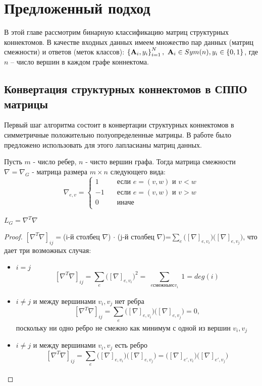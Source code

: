 \chapter{Предложенный подход}

В этой главе рассмотрим бинарную классификацию матриц структурных коннектомов. В качестве входных данных имеем множество пар данных (матриц смежности) и ответов (меток классов): $ \left\{ {\bf A}_i, y_i \right\}_{i=1}^N, \ {\bf A}_i \in Sym(n), y_i \in \left\{ 0,1 \right\}$, где $n$ – число вершин в каждом графе коннектома.

\section{Конвертация структурных коннектомов в СППО матрицы}
Первый шаг алгоритма состоит в конвертации структурных коннектомов в симметричные положительно полуопределенные матрицы. В работе \cite{dodero2015kernel} было предложено использовать для этого лапласианы матриц данных.

\begin{definition}
Пусть $m$ - число ребер, $n$ - чисто вершин графа. Тогда матрица смежности $\nabla = \nabla_G$ - матрица размера $m \times n$ следующего вида:
\begin{equation*} 
\nabla_{e,v} = 
\begin{cases}
1 & \quad \text{если } e=(v,w) \text{ и } v<w \\
-1 & \quad \text{если } e=(v,w) \text{ и } v>w \\
0 & \quad \text{иначе}\\
\end{cases}
\end{equation*} 
\end{definition}

\begin{lemma}
$L_G = \nabla^T \nabla$
\end{lemma}
\begin{proof}
$[\nabla^T\nabla]_{ij}=$(i-й столбец $\nabla$) $\cdot$ (j-й столбец $\nabla$)=$\sum_e\big( [\nabla]_{e,v_i} \big)\big( [\nabla]_{e,v_j} \big)$, что дает три возможных случая:
\begin{itemize}
    \item $i=j$
    $$ [\nabla^T\nabla]_{ij} = \sum_{\substack{e}}\Big( [\nabla]_{e,v_i} \Big)^2 = \sum_{\substack{e смежные с v_i}}1 = deg(i) $$
    \item $i \neq j$ и между вершинами $v_i, v_j$ нет ребра
    $$ [\nabla^T\nabla]_{ij} = \sum_{\substack{e}}\Big( [\nabla]_{e,v_i} \Big)\Big( [\nabla]_{e,v_j} \Big) = 0,$$
    поскольку ни одно ребро не смежно как минимум с одной из вершин $v_i, v_j$
    \item  $i \neq j$ и между вершинами $v_i, v_j$ есть ребро
    $$ [\nabla^T\nabla]_{ij} = \sum_{\substack{e}}\Big( [\nabla]_{e,v_i} \Big)\Big( [\nabla]_{e,v_j} \Big) = \Big( [\nabla]_{e',v_i} \Big)\Big( [\nabla]_{e',v_j} \Big)$$
\end{itemize}
\end{proof}

